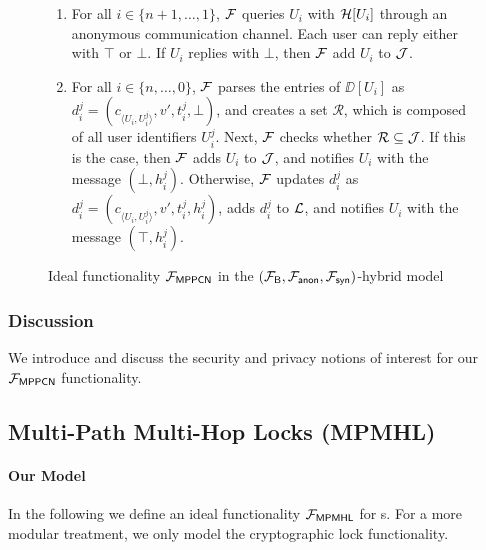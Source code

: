 \begin{figure*}[!t]
{{\begin{enumerate}
	\item For all $i \in \{n+1,\ldots,1\}$, $\mathcal{F}$ queries $U_i$ with $\mathcal{H}[U_i]$ through an 
	anonymous communication channel. Each user can reply either with $\top$ or $\bot$. If 
	$U_i$ replies with $\bot$, then $\mathcal{F}$ add $U_i$ to $\mathcal{J}$.
	
	\item For all $i \in \{n,\ldots,0\}$, $\mathcal{F}$ parses the entries of $\DD[U_i]$ as 
	$d_i^j = (c_{\langle U_i,U_i^j \rangle}, v', t_i^j, \bot)$, and creates a set 
	$\mathcal{R}$, which is composed of all user identifiers $U_i^j$. Next, $\mathcal{F}$ checks 
	whether $\mathcal{R} \subseteq \mathcal{J}$. If this is the case, then $\mathcal{F}$ adds $U_i$ to $\mathcal{J}$, 
	and notifies $U_i$ with the message $(\bot, h_i^j)$. Otherwise, $\mathcal{F}$ updates $d_i^j$ as 
	$d_i^j = (c_{\langle U_i,U_i^j \rangle}, v', t_i^j, h_i^j)$, adds $d_i^j$ to $\mathcal{L}$, and 
	notifies $U_i$ with the message $(\top, h_i^j)$.
\end{enumerate}
}}
\caption{Ideal functionality $\mathcal{F}_{\mathsf{MPPCN}}$ in the 
$(\mathcal{F}_{\mathsf{B}}, \mathcal{F}_{\mathsf{anon}}, \mathcal{F}_{\mathsf{syn}})$-hybrid model}
\label{fig:pcn}
\end{figure*}

\subsubsection{Discussion}
\label{sec:mppcn-discussion}

We introduce and discuss the security and privacy notions of interest for our 
$\mathcal{F}_{\mathsf{MPPCN}}$ functionality.

\subsection{Multi-Path Multi-Hop Locks (MPMHL)}
\label{sec:mpmhl}

\paragraph{Our Model}
In the following we define an ideal functionality $\mathcal{F}_{\mathsf{MPMHL}}$ for {\sysname}s. For a 
more modular treatment, we only model the cryptographic lock functionality.


